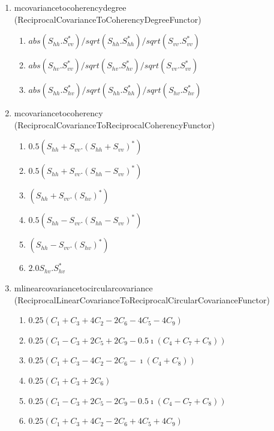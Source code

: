 \begin{enumerate}
\item mcovariancetocoherencydegree (ReciprocalCovarianceToCoherencyDegreeFunctor)
\begin{enumerate}
\item $ abs(S_{hh}.S_{vv}^{*}) / sqrt(S_{hh}.S_{hh}^{*}) / sqrt(S_{vv}.S_{vv}^{*}) $ 
\item $ abs(S_{hv}.S_{vv}^{*}) / sqrt(S_{hv}.S_{hv}^{*}) / sqrt(S_{vv}.S_{vv}^{*}) $ 
\item $ abs(S_{hh}.S_{hv}^{*}) / sqrt(S_{hh}.S_{hh}^{*}) / sqrt(S_{hv}.S_{hv}^{*}) $
\end{enumerate}
 
\item mcovariancetocoherency (ReciprocalCovarianceToReciprocalCoherencyFunctor)
\begin{enumerate}
\item $ 0.5(S_{hh}+S_{vv}.(S_{hh}+S_{vv})^{*}) $ 
\item $ 0.5(S_{hh}+S_{vv}.(S_{hh}-S_{vv})^{*}) $ 
\item $ (S_{hh}+S_{vv}.(S_{hv})^{*}) $ 
\item $ 0.5(S_{hh}-S_{vv}.(S_{hh}-S_{vv})^{*}) $ 
\item $ (S_{hh}-S_{vv}.(S_{hv})^{*}) $ 
\item $ 2.0 S_{hv}.S_{hv}^{*} $
\end{enumerate}
 
\item mlinearcovariancetocircularcovariance (ReciprocalLinearCovarianceToReciprocalCircularCovarianceFunctor)
\begin{enumerate}
\item $ 0.25(C_{1}+C_{3}+4 C_{2}-2 C_{6}-4 C_{5}-4 C_{9}) $ 
\item $ 0.25(C_{1}-C_{3}+2 C_{5}+2 C_{9} - 0.5\imath (C_{4}+C_{7}+C_{8})) $ 
\item $ 0.25(C_{1}+C_{3}-4 C_{2}-2 C_{6} - \imath (C_{4}+C_{8})) $ 
\item $ 0.25(C_{1}+C_{3}+2 C_{6}) $ 
\item $ 0.25(C_{1}-C_{3}+2 C_{5}-2 C_{9} - 0.5\imath (C_{4}-C_{7}+C_{8})) $ 
\item $ 0.25(C_{1}+C_{3}+4 C_{2}-2 C_{6}+4 C_{5}+4 C_{9}) $
\end{enumerate}


\end{enumerate}
